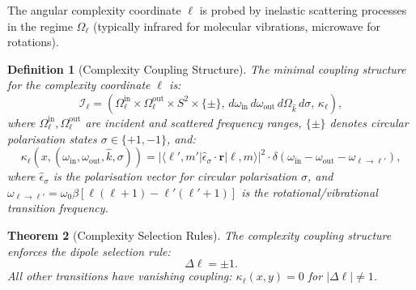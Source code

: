 \documentclass[twocolumn,10pt,a4paper]{article}
\newtheorem{theorem}{Theorem}[section]
\newtheorem{definition}[theorem]{Definition}
\theoremstyle{remark}
\begin{document}
The angular complexity coordinate $\ell$ is probed by inelastic scattering processes in the regime $\Omega_\ell$ (typically infrared for molecular vibrations, microwave for rotations).

\begin{definition}[Complexity Coupling Structure]
\label{def:complexity_coupling}
The minimal coupling structure for the complexity coordinate $\ell$ is:
\begin{equation}
\mathcal{I}_\ell = \left( \Omega_\ell^{\text{in}} \times \Omega_\ell^{\text{out}} \times S^2 \times \{\pm\}, \, d\omega_{\text{in}} \, d\omega_{\text{out}} \, d\Omega_{\hat{k}} \, d\sigma, \, \kappa_\ell \right),
\end{equation}
where $\Omega_\ell^{\text{in}}, \Omega_\ell^{\text{out}}$ are incident and scattered frequency ranges, $\{\pm\}$ denotes circular polarisation states $\sigma \in \{+1, -1\}$, and:
\begin{equation}
\kappa_\ell(x, (\omega_{\text{in}}, \omega_{\text{out}}, \hat{k}, \sigma)) = \left|\langle \ell', m' | \hat{\epsilon}_\sigma \cdot \mathbf{r} | \ell, m \rangle\right|^2 \cdot \delta(\omega_{\text{in}} - \omega_{\text{out}} - \omega_{\ell \to \ell'}),
\end{equation}
where $\hat{\epsilon}_\sigma$ is the polarisation vector for circular polarisation $\sigma$, and $\omega_{\ell \to \ell'} = \omega_0 \beta [\ell(\ell+1) - \ell'(\ell'+1)]$ is the rotational/vibrational transition frequency.
\end{definition}

\begin{theorem}[Complexity Selection Rules]
\label{thm:complexity_selection}
The complexity coupling structure enforces the dipole selection rule:
\begin{equation}
\Delta \ell = \pm 1.
\end{equation}
All other transitions have vanishing coupling: $\kappa_\ell(x, y) = 0$ for $|\Delta \ell| \neq 1$.
\end{theorem}
\end{document}
